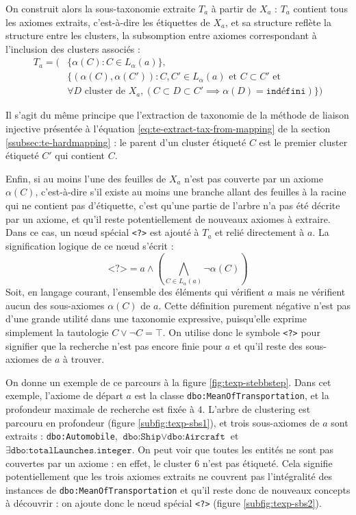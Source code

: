 On construit alors la sous-taxonomie extraite $T_a$ à partir de $X_a$ : $T_a$ contient tous les axiomes extraits, c'est-à-dire les étiquettes de $X_a$, et sa structure reflète la structure entre les clusters, la subsomption entre axiomes correspondant à l'inclusion des clusters associés :
\begin{align}
    T_a = (& \{ \alpha(C) : C \in L_\alpha(a) \}, \nonumber \\
        & \{ (\alpha(C), \alpha(C')) : C, C' \in L_\alpha(a) \textrm{ et } C \subset C' \textrm{ et} \nonumber  \\
    & \forall D \textrm{ cluster de } X_a, (C \subset D \subset C' \implies \alpha(D) = \texttt{indéfini})\})
\end{align}

Il s'agit du même principe que l'extraction de taxonomie de la méthode de liaison injective présentée à l'équation \ref{eq:te-extract-tax-from-mapping} de la section \ref{ssubsec:te-hardmapping} : le parent d'un cluster étiqueté $C$ est le premier cluster étiqueté $C'$ qui contient $C$.


Enfin, si au moins l'une des feuilles de $X_a$ n'est pas couverte par un axiome $\alpha(C)$, c'est-à-dire s'il existe au moins une branche allant des feuilles à la racine qui ne contient pas d'étiquette, c'est qu'une partie de l'arbre n'a pas été décrite par un axiome, et qu'il reste potentiellement de nouveaux axiomes à extraire. Dans ce cas, un nœud spécial \texttt{<?>} est ajouté à $T_a$ et relié directement à $a$. La signification logique de ce nœud s'écrit :
\begin{equation}
    \texttt{<?>} = a \land \left( \bigwedge\limits_{C \in L_\alpha(a)} \neg \alpha(C) \right)
    \label{eq:texp-special-node}
\end{equation}
Soit, en langage courant, l'ensemble des éléments qui vérifient $a$ mais ne vérifient aucun des sous-axiomes $\alpha(C)$ de $a$. Cette définition purement négative n'est pas d'une grande utilité dans une taxonomie expressive, puisqu'elle exprime simplement la tautologie $C \lor \neg C = \top$. On utilise donc le symbole \texttt{<?>} pour signifier que la recherche n'est pas encore finie pour $a$ et qu'il reste des sous-axiomes de $a$ à trouver.

On donne un exemple de ce parcours à la figure \ref{fig:texp-stebbstep}. Dans cet exemple, l'axiome de départ $a$ est la classe \texttt{dbo:MeanOfTransportation}, et la profondeur maximale de recherche est fixée à $4$. L'arbre de clustering est parcouru en profondeur (figure \ref{subfig:texp-sbs1}), et trois sous-axiomes de $a$ sont extraits : \texttt{dbo:Automobile}, $\texttt{dbo:Ship} \lor \texttt{dbo:Aircraft}$ et $\exists \texttt{dbo:totalLaunches} . \texttt{integer}$. On peut voir que toutes les entités ne sont pas couvertes par un axiome : en effet, le cluster 6 n'est pas étiqueté. Cela signifie potentiellement que les trois axiomes extraits ne couvrent pas l'intégralité des instances de \texttt{dbo:MeanOfTransportation} et qu'il reste donc de nouveaux concepts à découvrir : on ajoute donc le nœud spécial \texttt{<?>} (figure \ref{subfig:texp-sbs2}).

